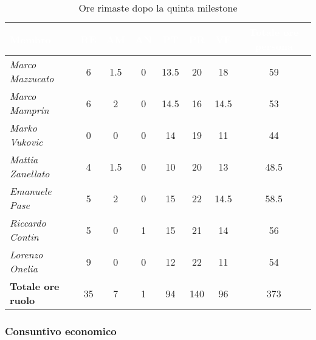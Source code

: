 \begin{table}[H]
    \renewcommand\arraystretch{1.5}
    \centering
    \begin{tabular}{|l|c|c|c|c|c|c|c|}
    \hline
    \rowcolor[HTML]{036400}
    \textcolor{white}{\textbf{Membro}} & \multicolumn{1}{c|}{\textcolor{white}{\textbf{RE}}} & \multicolumn{1}{c|}{\textcolor{white}{\textbf{AM}}} & \multicolumn{1}{c|}{\textcolor{white}{\textbf{AN}}} & \multicolumn{1}{c|}{\textcolor{white}{\textbf{PT}}} & \multicolumn{1}{c|}{\textcolor{white}{\textbf{PR}}} & \multicolumn{1}{c|}{\textcolor{white}{\textbf{VE}}} & \multicolumn{1}{c|}{\textcolor{white}{\textbf{Totale ore persona}}} \\ \hline
    \rowcolor[HTML]{EFEFEF}\textit{Marco Mazzucato}  & 6    & 1.5  & 0     & 13.5  & 20  & 18     & 59     \\ \hline
    \rowcolor[HTML]{C0C0C0}\textit{Marco Mamprin}    & 6    & 2    & 0     & 14.5  & 16  & 14.5   & 53     \\ \hline
    \rowcolor[HTML]{EFEFEF}\textit{Marko Vukovic}    & 0    & 0    & 0     & 14    & 19  & 11     & 44     \\ \hline
    \rowcolor[HTML]{C0C0C0}\textit{Mattia Zanellato} & 4    & 1.5  & 0     & 10    & 20  & 13     & 48.5     \\ \hline
    \rowcolor[HTML]{EFEFEF}\textit{Emanuele Pase}    & 5    & 2    & 0     & 15    & 22  & 14.5   & 58.5     \\ \hline
    \rowcolor[HTML]{C0C0C0}\textit{Riccardo Contin}  & 5    & 0    & 1     & 15    & 21  & 14     & 56     \\ \hline
    \rowcolor[HTML]{EFEFEF}\textit{Lorenzo Onelia}   & 9    & 0    & 0     & 12    & 22  & 11     & 54     \\ \hline
    \rowcolor[HTML]{C0C0C0}\textbf{Totale ore ruolo} & 35   & 7    & 1     & 94    & 140 & 96     & 373    \\ \hline
    \end{tabular}
    \caption{Ore rimaste dopo la quinta milestone}
\end{table}

\subsubsection{Consuntivo economico}

